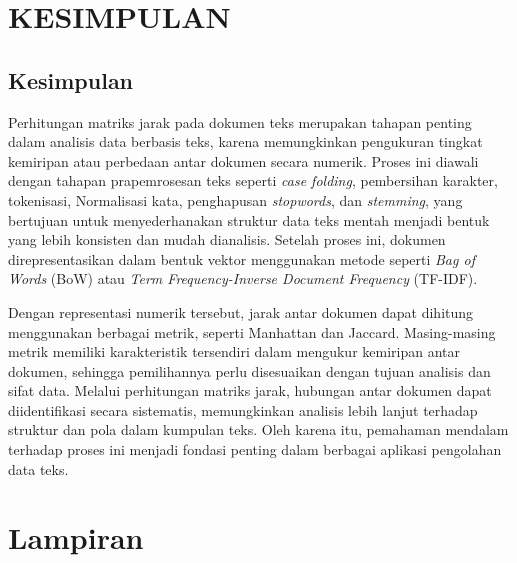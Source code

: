\documentclass[a4paper,12pt]{report}
\numberwithin{equation}{chapter}
\begin{document}
\chapter{KESIMPULAN}
\label{chap:kesimpulan}
\section{Kesimpulan}
\label{sec:kesimpulan}
Perhitungan matriks jarak pada dokumen teks merupakan tahapan penting dalam analisis data berbasis teks, karena memungkinkan pengukuran tingkat kemiripan atau perbedaan antar dokumen secara numerik. Proses ini diawali dengan tahapan prapemrosesan teks seperti \textit{case folding}, pembersihan karakter, tokenisasi, Normalisasi kata, penghapusan \textit{stopwords}, dan \textit{stemming}, yang bertujuan untuk menyederhanakan struktur data teks mentah menjadi bentuk yang lebih konsisten dan mudah dianalisis. Setelah proses ini, dokumen direpresentasikan dalam bentuk vektor menggunakan metode seperti \textit{Bag of Words} (BoW) atau \textit{Term Frequency-Inverse Document Frequency} (TF-IDF).

Dengan representasi numerik tersebut, jarak antar dokumen dapat dihitung menggunakan berbagai metrik, seperti Manhattan dan Jaccard. Masing-masing metrik memiliki karakteristik tersendiri dalam mengukur kemiripan antar dokumen, sehingga pemilihannya perlu disesuaikan dengan tujuan analisis dan sifat data. Melalui perhitungan matriks jarak, hubungan antar dokumen dapat diidentifikasi secara sistematis, memungkinkan analisis lebih lanjut terhadap struktur dan pola dalam kumpulan teks. Oleh karena itu, pemahaman mendalam terhadap proses ini menjadi fondasi penting dalam berbagai aplikasi pengolahan data teks.

\newpage
\renewcommand{\bibname}{DAFTAR PUSTAKA} %


\chapter*{Lampiran}
\label{chap:lampiran}
\end{document}

